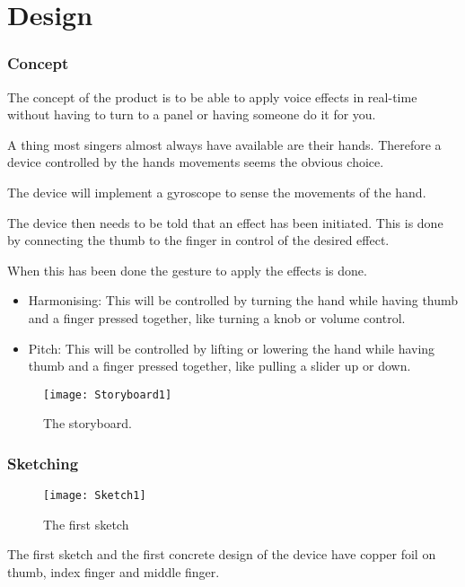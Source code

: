 \chapter{Design}

\subsection{Concept}
The concept of the product is to be able to apply voice effects in real-time without having to turn to a panel or having someone do it for you. 

A thing most singers almost always have available are their hands. Therefore a device controlled by the hands movements seems the obvious choice.

The device will implement a gyroscope to sense the movements of the hand.

The device then needs to be told that an effect has been initiated. This is done by connecting the thumb to the finger in control of the desired effect.

When this has been done the gesture to apply the effects is done. 

\begin{itemize}
\item Harmonising: This will be controlled by turning the hand while having thumb and a finger pressed together, like turning a knob or volume control.
\item Pitch: This will be controlled by lifting or lowering the hand while having thumb and a finger pressed together, like pulling a slider up or down.
\end{itemize}

\begin{figure}[!h]
\centering
\texttt{[image: Storyboard1]}
\caption{The storyboard.} \label{Storyboard1}
\end{figure}


\subsection{Sketching}
\begin{figure}[!h]
\centering
\texttt{[image: Sketch1]}
\caption{The first sketch} \label{Sketch1}
\end{figure}

The first sketch and the first concrete design of the device have copper foil on thumb, index finger and middle finger. 

